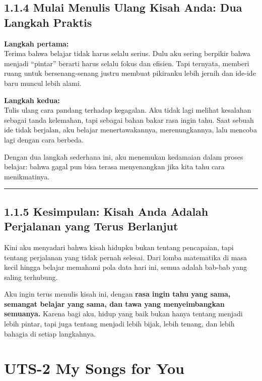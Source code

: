 \documentclass[
  letterpaper,
  DIV=11,
  numbers=noendperiod]{scrreprt}
\begin{document}
\section{1.1.4 Mulai Menulis Ulang Kisah Anda: Dua Langkah
Praktis}\label{mulai-menulis-ulang-kisah-anda-dua-langkah-praktis}

\textbf{Langkah pertama:}\\
Terima bahwa belajar tidak harus selalu serius. Dulu aku sering berpikir
bahwa menjadi ``pintar'' berarti harus selalu fokus dan efisien. Tapi
ternyata, memberi ruang untuk bersenang-senang justru membuat pikiranku
lebih jernih dan ide-ide baru muncul lebih alami.

\textbf{Langkah kedua:}\\
Tulis ulang cara pandang terhadap kegagalan. Aku tidak lagi melihat
kesalahan sebagai tanda kelemahan, tapi sebagai bahan bakar rasa ingin
tahu. Saat sebuah ide tidak berjalan, aku belajar menertawakannya,
merenungkannya, lalu mencoba lagi dengan cara berbeda.

Dengan dua langkah sederhana ini, aku menemukan kedamaian dalam proses
belajar: bahwa gagal pun bisa terasa menyenangkan jika kita tahu cara
menikmatinya.

\begin{center}\rule{0.5\linewidth}{0.5pt}\end{center}

\section{1.1.5 Kesimpulan: Kisah Anda Adalah Perjalanan yang Terus
Berlanjut}\label{kesimpulan-kisah-anda-adalah-perjalanan-yang-terus-berlanjut}

Kini aku menyadari bahwa kisah hidupku bukan tentang pencapaian, tapi
tentang perjalanan yang tidak pernah selesai. Dari lomba matematika di
masa kecil hingga belajar memahami pola data hari ini, semua adalah
bab-bab yang saling terhubung.

Aku ingin terus menulis kisah ini, dengan \textbf{rasa ingin tahu yang
sama, semangat belajar yang sama, dan tawa yang menyeimbangkan
semuanya.} Karena bagi aku, hidup yang baik bukan hanya tentang menjadi
lebih pintar, tapi juga tentang menjadi lebih bijak, lebih tenang, dan
lebih bahagia di setiap langkahnya.


\chapter{UTS-2 My Songs for You}\label{uts-2-my-songs-for-you}
\end{document}
